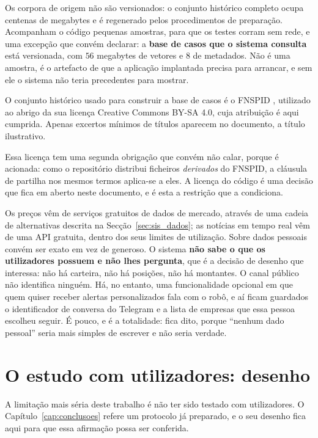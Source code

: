 Os corpora de origem não são versionados: o conjunto histórico completo ocupa centenas de megabytes
e é regenerado pelos procedimentos de preparação. Acompanham o código pequenas amostras, para que os
testes corram sem rede, e uma excepção que convém declarar: a \textbf{base de casos que o sistema
consulta} está versionada, com $56$ megabytes de vetores e $8$ de metadados. Não é uma amostra, é o
artefacto de que a aplicação implantada precisa para arrancar, e sem ele o sistema não teria
precedentes para mostrar.

O conjunto histórico usado para construir a base de casos é o \gls{FNSPID}
\autocite{dong2024fnspid}, utilizado ao abrigo da sua licença Creative Commons BY-SA 4.0, cuja
atribuição é aqui cumprida. Apenas excertos mínimos de títulos aparecem no documento, a título
ilustrativo.

Essa licença tem uma segunda obrigação que convém não calar, porque é acionada: como o repositório
distribui ficheiros \emph{derivados} do \gls{FNSPID}, a cláusula de partilha nos mesmos termos
aplica-se a eles. A licença do código é uma decisão que fica em aberto neste documento, e é esta a
restrição que a condiciona.

Os preços vêm de serviços gratuitos de dados de mercado, através de uma cadeia de alternativas
descrita na Secção~\ref{sec:sis_dados}; as notícias em tempo real vêm de uma API gratuita, dentro dos
seus limites de utilização. Sobre dados pessoais convém ser exato em vez de generoso. O sistema
\textbf{não sabe o que os utilizadores possuem e não lhes pergunta}, que é a decisão de desenho que
interessa: não há carteira, não há posições, não há montantes. O canal público não identifica
ninguém. Há, no entanto, uma funcionalidade opcional em que quem quiser receber alertas
personalizados fala com o robô, e aí ficam guardados o identificador de conversa do Telegram e a
lista de empresas que essa pessoa escolheu seguir. É pouco, e é a totalidade: fica dito, porque
``nenhum dado pessoal'' seria mais simples de escrever e não seria verdade.

\section{O estudo com utilizadores: desenho}
\label{sec:ap_estudo}

A limitação mais séria deste trabalho é não ter sido testado com utilizadores. O
Capítulo~\ref{cap:conclusoes} refere um protocolo já preparado, e o seu desenho fica aqui para que
essa afirmação possa ser conferida.

